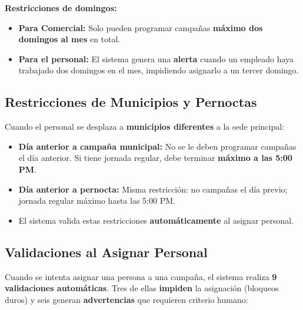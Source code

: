 \documentclass[9pt,a4paper]{extarticle}
\begin{document}
\textbf{Restricciones de domingos:}
\begin{itemize}[leftmargin=2em]
    \item \textbf{Para Comercial:} Solo pueden programar campañas \textbf{m\'{a}ximo dos domingos al mes} en total.
    \item \textbf{Para el personal:} El sistema genera una \textbf{alerta} cuando un empleado haya trabajado dos domingos en el mes, impidiendo asignarlo a un tercer domingo.
\end{itemize}

\subsection{Restricciones de Municipios y Pernoctas}

Cuando el personal se desplaza a \textbf{municipios diferentes} a la sede principal:

\begin{itemize}[leftmargin=2em]
    \item \textbf{D\'{i}a anterior a campaña municipal:} No se le deben programar campañas el d\'{i}a anterior. Si tiene jornada regular, debe terminar \textbf{m\'{a}ximo a las 5:00 PM}.
    \item \textbf{D\'{i}a anterior a pernocta:} Misma restricci\'{o}n: no campañas el d\'{i}a previo; jornada regular m\'{a}ximo hasta las 5:00 PM.
    \item El sistema valida estas restricciones \textbf{autom\'{a}ticamente} al asignar personal.
\end{itemize}

\subsection{Validaciones al Asignar Personal}

Cuando se intenta asignar una persona a una campaña, el sistema realiza \textbf{9 validaciones autom\'{a}ticas}. Tres de ellas \textbf{impiden} la asignaci\'{o}n (bloqueos duros) y seis generan \textbf{advertencias} que requieren criterio humano:
\end{document}
